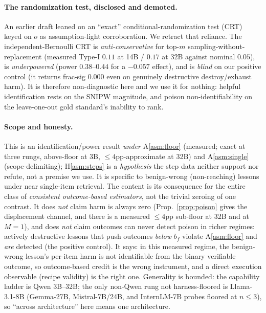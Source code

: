 \paragraph{The randomization test, disclosed and demoted.} An earlier draft leaned on an
``exact'' conditional-randomization test (CRT) keyed on $o$ as assumption-light
corroboration. We retract that reliance. The independent-Bernoulli CRT is
\emph{anti-conservative} for top-$m$ sampling-without-replacement (measured Type-I
$0.11$ at 14B / $0.17$ at 32B against nominal $0.05$), is \emph{underpowered} (power
$0.38$--$0.44$ for a $-0.057$ effect), and is \emph{blind} on our positive control (it
returns frac-sig $0.000$ even on genuinely destructive destroy/exhaust harm). It is
therefore non-diagnostic here and we use it for nothing: helpful identification rests on
the SNIPW magnitude, and poison non-identifiability on the leave-one-out gold standard's
inability to rank.

\paragraph{Scope and honesty.} This is an identification/power result \emph{under}
A\ref{asm:floor} (measured; exact at three rungs, above-floor at 3B, $\le4$pp-approximate at 32B) and
A\ref{asm:single} (scope-delimiting); H\ref{asm:steps} is a \emph{hypothesis} the step
data neither support nor refute, not a premise we use. It is specific to benign-wrong (non-reaching)
lessons under near single-item retrieval. The content is its consequence for the entire
class of \emph{consistent outcome-based estimators}, not the trivial zeroing of one
contrast. It does \emph{not} claim harm is always zero (Prop.~\ref{prop:poison} gives the
displacement channel, and there is a measured $\le4$pp sub-floor at 32B and at $M{=}1$),
and does \emph{not} claim outcomes can never detect poison in richer regimes: actively
destructive lessons that push outcomes \emph{below} $b_f$ violate A\ref{asm:floor} and
\emph{are} detected (the positive control). It says: in this measured regime, the
benign-wrong lesson's per-item harm is not identifiable from the binary verifiable
outcome, so outcome-based credit is the wrong instrument, and a direct execution
observable (recipe validity) is the right one. Generality is bounded: the capability
ladder is Qwen 3B--32B; the only non-Qwen rung not harness-floored is Llama-3.1-8B
(Gemma-27B, Mistral-7B/24B, and InternLM-7B probes floored at $n\le3$), so ``across
architecture'' here means one architecture.

